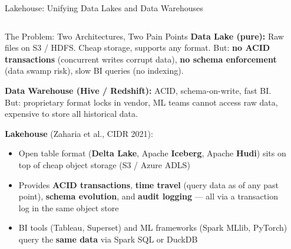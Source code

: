 \documentclass[aspectratio=169,10pt]{beamer}
\begin{document}
\begin{frame}{Lakehouse: Unifying Data Lakes and Data Warehouses}
  \begin{columns}[T]
      \begin{block}{The Problem: Two Architectures, Two Pain Points}
        \small
        \textbf{Data Lake (pure):}  Raw files on S3 / HDFS.  Cheap storage, supports any format.
        But: \textbf{no ACID transactions} (concurrent writes corrupt data), \textbf{no schema enforcement} (data swamp risk), slow BI queries (no indexing).

        \vspace{6pt}
        \textbf{Data Warehouse (Hive / Redshift):}  ACID, schema-on-write, fast BI.
        But: proprietary format locks in vendor, ML teams cannot access raw data, expensive to store all historical data.

        \vspace{6pt}
        \textbf{Lakehouse} (Zaharia et al., CIDR 2021):
        \begin{itemize}
          \item Open table format (\textbf{Delta Lake}, Apache \textbf{Iceberg}, Apache \textbf{Hudi}) sits on top of cheap object storage (S3 / Azure ADLS)
          \item Provides \textbf{ACID transactions}, \textbf{time travel} (query data as of any past point), \textbf{schema evolution}, and \textbf{audit logging} --- all via a transaction log in the same object store
          \item BI tools (Tableau, Superset) and ML frameworks (Spark MLlib, PyTorch) query the \textbf{same data} via Spark SQL or DuckDB
        \end{itemize}
      \end{block}

      \begin{center}
\end{center}
\end{columns}
\end{frame}
\end{document}
